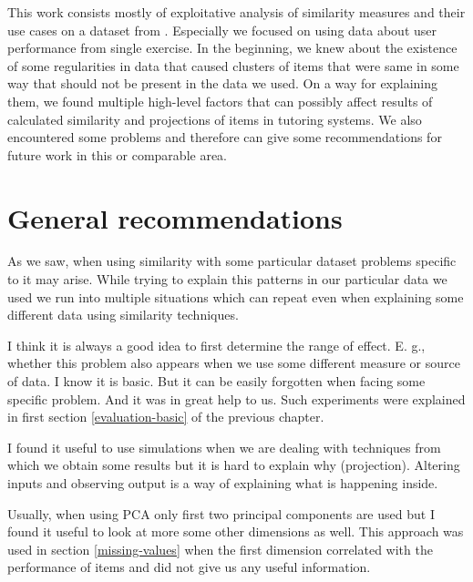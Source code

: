 \documentclass[
  digital, %
  table,   %
  nolof,     %
  nolot,     %
  nocover,
  color,
  final, %
]{fithesis3}
\begin{document}
This work consists mostly of exploitative analysis of similarity measures and their use cases on a dataset from \umimeCesky{}. Especially we focused on using data about user performance from single exercise. In the beginning, we knew about the existence of some regularities in data that caused clusters of items that were same in some way that should not be present in the data we used. On a way for explaining them, we found multiple high-level factors that can possibly affect results of calculated similarity and projections of items in tutoring systems. We also encountered some problems and therefore can give some recommendations for future work in this or comparable area.


\section{General recommendations}\label{general-recommendations}

As we saw, when using similarity with some particular dataset problems specific to it may arise. While trying to explain this patterns in our particular data we used we run into multiple situations which can repeat even when explaining some different data using similarity techniques.


I think it is always a good idea to first determine the range of effect. E. g., whether this problem also appears when we use some different measure or source of data. I know it is basic. But it can be easily forgotten when facing some specific problem. And it was in great help to us. Such experiments were explained in first section \ref{evaluation-basic} of the previous chapter.


I found it useful to use simulations when we are dealing with techniques from which we obtain some results but it is hard to explain why (projection). Altering inputs and observing output is a way of explaining what is happening inside.


Usually, when using PCA only first two principal components are used but I found it useful to look at more some other dimensions as well. This approach was used in section \ref{missing-values} when the first dimension correlated with the performance of items and did not give us any useful information.
\end{document}
